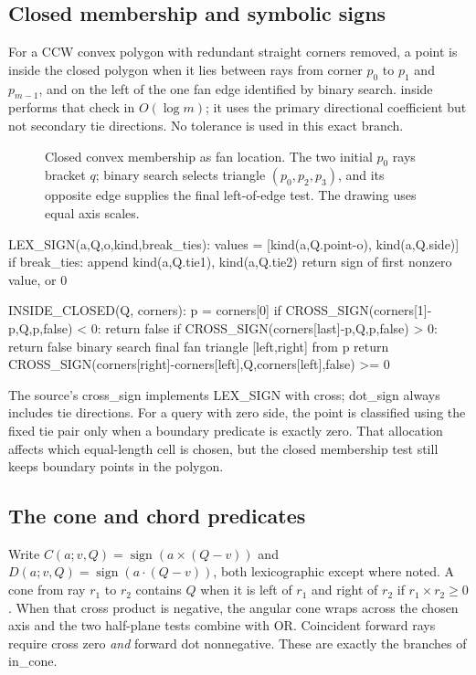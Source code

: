 \documentclass[12pt,a4paper]{article}
\newcommand{\cross}{\mathbin{\times}}
\newcommand{\code}[1]{{\ttfamily\color{codekw}#1}}
\begin{document}
\subsection{Closed membership and symbolic signs}
For a CCW convex polygon with redundant straight corners removed, a point is inside the closed polygon when it lies between rays from corner \(p_0\) to \(p_1\) and \(p_{m-1}\), and on the left of the one fan edge identified by binary search. \code{inside} performs that check in \(O(\log m)\); it uses the primary directional coefficient but not secondary tie directions. No tolerance is used in this exact branch.

\begin{figure}[h]\centering\figmembership\caption{Closed convex membership as fan location. The two initial \(p_0\) rays bracket \(q\); binary search selects triangle \((p_0,p_2,p_3)\), and its opposite edge supplies the final left-of-edge test. The drawing uses equal axis scales.}\label{fig:membership}\end{figure}

\begin{pseudo}
LEX_SIGN(a,Q,o,kind,break_ties):
  values = [kind(a,Q.point-o), kind(a,Q.side)]
  if break_ties: append kind(a,Q.tie1), kind(a,Q.tie2)
  return sign of first nonzero value, or 0

INSIDE_CLOSED(Q, corners):
  p = corners[0]
  if CROSS_SIGN(corners[1]-p,Q,p,false) < 0: return false
  if CROSS_SIGN(corners[last]-p,Q,p,false) > 0: return false
  binary search final fan triangle [left,right] from p
  return CROSS_SIGN(corners[right]-corners[left],Q,corners[left],false) >= 0
\end{pseudo}

The source's \code{cross\_sign} implements \code{LEX\_SIGN} with cross; \code{dot\_sign} always includes tie directions. For a query with zero \code{side}, the point is classified using the fixed tie pair only when a boundary predicate is exactly zero. That allocation affects which equal-length cell is chosen, but the closed membership test still keeps boundary points in the polygon.

\subsection{The cone and chord predicates}
Write \(C(a;v,Q)=\operatorname{sign}(a\cross(Q-v))\) and \(D(a;v,Q)=\operatorname{sign}(a\cdot(Q-v))\), both lexicographic except where noted. A cone from ray \(r_1\) to \(r_2\) contains \(Q\) when it is left of \(r_1\) and right of \(r_2\) if \(r_1\cross r_2\ge0\). When that cross product is negative, the angular cone wraps across the chosen axis and the two half-plane tests combine with OR. Coincident forward rays require cross zero \emph{and} forward dot nonnegative. These are exactly the branches of \code{in\_cone}.
\end{document}
